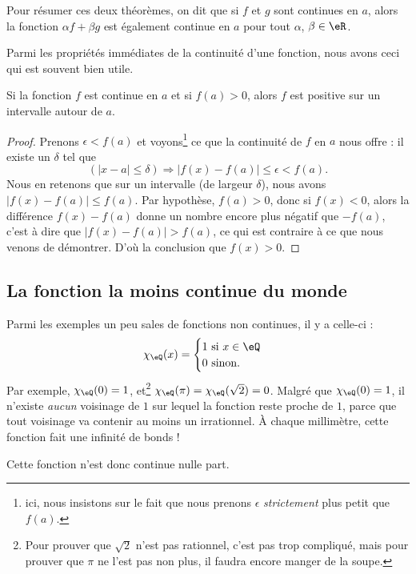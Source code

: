 Pour résumer ces deux théorèmes, on dit que si $f$ et $g$ sont continues en $a$, alors la fonction $\alpha f+\beta g$ est également continue en $a$ pour tout $\alpha$, $\beta\in\eR$.

Parmi les propriétés immédiates de la continuité d'une fonction, nous avons ceci qui est souvent bien utile.

\begin{corollary}
Si la fonction $f$ est continue en $a$ et si $f(a)>0$, alors $f$ est positive sur un intervalle autour de $a$.
\end{corollary}

\begin{proof}
Prenons $\epsilon<f(a)$ et voyons\footnote{ici, nous insistons sur le fait que nous prenons $\epsilon$ \emph{strictement} plus petit que $f(a)$.} ce que la continuité de $f$ en $a$ nous offre : il existe un $\delta$ tel que
\[ 
  (| x-a |\leq \delta)\Rightarrow | f(x)-f(a) |\leq\epsilon < f(a).
\]
Nous en retenons que sur un intervalle (de largeur $\delta$), nous avons $| f(x)-f(a) |\leq f(a)$. Par hypothèse, $f(a)>0$, donc si $f(x)<0$, alors la différence $f(x)-f(a)$ donne un nombre encore plus négatif que $-f(a)$, c'est à dire que $| f(x)-f(a) |>f(a)$, ce qui est contraire à ce que nous venons de démontrer. D'où la conclusion que $f(x)>0$.
\end{proof}

\subsection{La fonction la moins continue du monde}

Parmi les exemples un peu sales de fonctions non continues, il y a celle-ci :
\[ 
  \chi_{\eQ}(x)=
\begin{cases}
    1 \text{ si $x\in\eQ$}\\
    0 \text{ sinon.}
\end{cases}
\]
Par exemple, $\chi_{\eQ}(0)=1$, et\footnote{Pour prouver que $\sqrt{2}$ n'est pas rationnel, c'est pas trop compliqué, mais pour prouver que $\pi$ ne l'est pas non plus, il faudra encore manger de la soupe.} $\chi_{\eQ}(\pi)=\chi_{\eQ}(\sqrt{2})=0$. Malgré que $\chi_{\eQ}(0)=1$, il n'existe \emph{aucun} voisinage de $1$ sur lequel la fonction reste proche de $1$, parce que tout voisinage va contenir au moins un irrationnel. À chaque millimètre, cette fonction fait une infinité de bonds !

Cette fonction n'est donc continue nulle part. 

